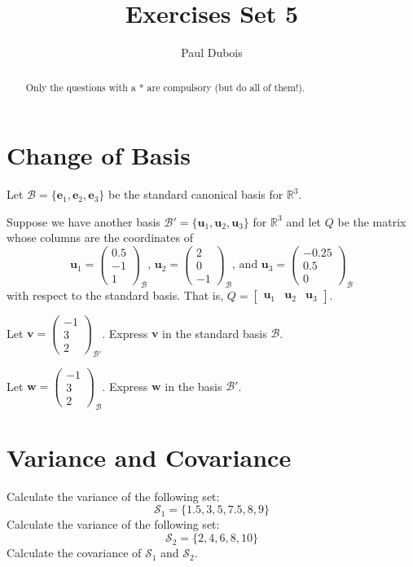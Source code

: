 \documentclass[]{article}
\title{Exercises Set 5}
\author{Paul Dubois}
\begin{document}
	
	\maketitle
	
	\begin{abstract}
		Only the questions with a * are compulsory (but do all of them!).
	\end{abstract}	
	
	\section{Change of Basis}

	Let $\mathcal{B} = \{ \mathbf{e}_1, \mathbf{e}_2, \mathbf{e}_3 \}$ be the standard canonical basis for $\mathbb{R}^3$.

	Suppose we have another basis $\mathcal{B}' = \{ \mathbf{u}_1, \mathbf{u}_2, \mathbf{u}_3 \}$ for $\mathbb{R}^3$ and let $Q$ be the matrix whose columns are the coordinates of 
	$$
	\mathbf{u}_1 = \begin{pmatrix} 0.5 \\ -1 \\ 1 \end{pmatrix}_{\mathcal{B}}
	\textit{, }
	\mathbf{u}_2 = \begin{pmatrix} 2 \\ 0 \\ -1 \end{pmatrix}_{\mathcal{B}}
	\text{, and }
	\mathbf{u}_3 = \begin{pmatrix} -0.25 \\ 0.5 \\ 0 \end{pmatrix}_{\mathcal{B}}
	$$
	with respect to the standard basis.
	That is, $
	Q = \begin{bmatrix}
		\mathbf{u}_1 & \mathbf{u}_2 & \mathbf{u}_3
	\end{bmatrix}
	$.
	
	Let $\mathbf{v} = \begin{pmatrix} -1 \\ 3 \\ 2 \end{pmatrix}_{\mathcal{B}'}$.
	Express $\mathbf{v}$ in the standard basis $\mathcal{B}$.
	
	Let $\mathbf{w} = \begin{pmatrix} -1 \\ 3 \\ 2 \end{pmatrix}_{\mathcal{B}}$.
	Express $\mathbf{w}$ in the basis $\mathcal{B}'$.
	
	\section{Variance and Covariance}
	Calculate the variance of the following set:
	$$
	\mathcal{S}_1 = \{ 1.5, 3, 5, 7.5, 8, 9 \}
	$$
	Calculate the variance of the following set:
	$$
	\mathcal{S}_2 = \{ 2, 4, 6, 8, 10 \}
	$$
	Calculate the covariance of $\mathcal{S}_1$ and $\mathcal{S}_2$.
\end{document}

